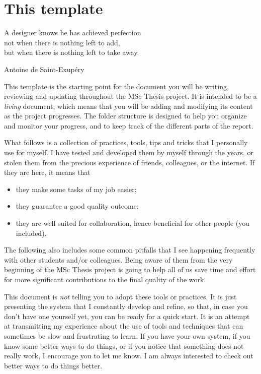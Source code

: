 \chapter{This template}
\label{ch:this-template}
%
\epigraph{
    A designer knows he has achieved perfection \\ 
    not when there is nothing left to add, \\
    but when there is nothing left to take away.
}{Antoine de Saint-Exupéry}

\noindent
This template is the starting point for the document you will be writing, reviewing and updating throughout the MSc Thesis project.
It is intended to be a \emph{living} document, which means that you will be adding and modifying its content as the project progresses.
The folder structure is designed to help you organize and monitor your progress, and to keep track of the different parts of the report.


What follows is a collection of practices, tools, tips and tricks that I personally use for myself. 
I have tested and developed them by myself through the years, or stolen them from the precious experience of friends, colleagues, or the internet.
If they are here, it means that 
\begin{itemize}
    \item they make some tasks of my job easier;
    \item they guarantee a good quality outcome;
    \item they are well suited for collaboration, hence beneficial for other people (you included).
\end{itemize}
%
The following also includes some common pitfalls that I see happening frequently with other students and/or colleagues. 
Being aware of them from the very beginning of the MSc Thesis project is going to help all of us save time and effort for more significant contributions to the final quality of the work.


This document is \emph{not} telling you to adopt these tools or practices. 
It is just presenting the system that I constantly develop and refine, so that, in case you don't have one yourself yet, you can be ready for a quick start. 
It is an attempt at transmitting my experience about the use of tools and techniques that can sometimes be slow and frustrating to learn.
If you have your own system, if you know some better ways to do things, or if you notice that something does not really work, I encourage you to let me know. 
I am always interested to check out better ways to do things better.



